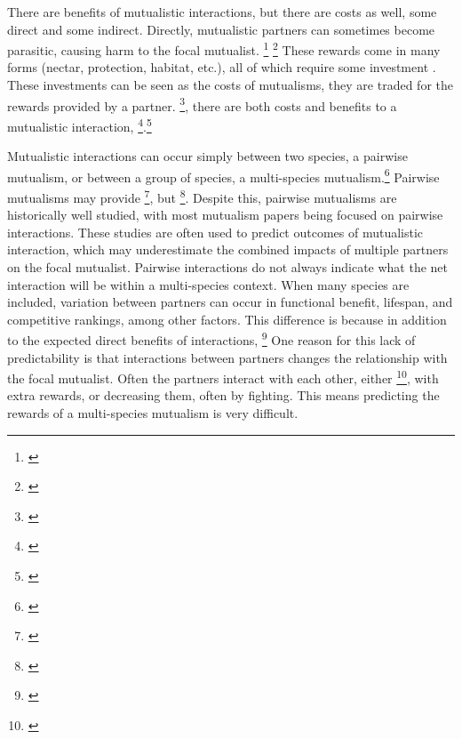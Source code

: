 \documentclass[12pt,a4paper]{article}
\newcommand{\tom}[2]{{\color{red}{#1}}\footnote{\textit{\color{red}{#2}}}}
\begin{document}
There are benefits of mutualistic interactions, but there are costs as well, some direct and some indirect. 
Directly, mutualistic partners can sometimes become parasitic, causing harm to the focal mutualist\cite{Bronstein2001a}. 
\tom{More indirectly, these interactions require energy.}{Awkward sentence, and I'm not sure why investment is reward is an indirect cost.} 
\tom{Within a mutualism, each participant offers rewards and in return receives benefits from their partners.}{No new information content in this sentence.} 
These rewards come in many forms (nectar, protection, habitat, etc.), all of which require some investment \cite{Bronstein2001}. 
These investments can be seen as the costs of mutualisms, they are traded for the rewards provided by a partner. 
\tom{Because of these trade-offs}{trade-offs between what and what?}, there are both costs and benefits to a mutualistic interaction\cite{Bronstein2001,Bronstein2001a}, \tom{particularly as the mutualism becomes more complex in the context of its environment}{I don't know what this means.}.\tom{}{Having made it to the end of this paragraph I can't really find any new information here. You are covering very basic aspects of mutualism that were already described in the first paragraph. I would get to the question/problem at the core of this paper more quickly.} 

Mutualistic interactions can occur simply between two species, a pairwise mutualism, or between a group of species, a multi-species mutualism\cite{Stanton2013}.\tom{}{Technically all mutualisms are pairwise (++) but they can be combined into many pairs.} 
Pairwise mutualisms may provide \tom{benefits of efficiency in the context of mutualisms}{I don't know what this means}, but \tom{they are not a good investment due to temporal and spatial variation}{Variation in what?}\cite{Waser1996}. 
Despite this, pairwise mutualisms are historically well studied, with most mutualism papers being focused on pairwise interactions. 
These studies are often used to predict outcomes of mutualistic interaction, which may underestimate the combined impacts of multiple partners on the focal mutualist\cite{Stanton2013,Palmer2010}. 
Pairwise interactions do not always indicate what the net interaction will be within a multi-species context\cite{Chamberlain2014,Song2020}. 
When many species are included, variation between partners can occur in functional benefit, lifespan, and competitive rankings, among other factors\cite{Stanton2013}. 
This difference is because in addition to the expected direct benefits of interactions, \tom{they can also indirectly impact the focal mutualist through other partner interactions. }{Again, I would avoid too much discussion of interaction between partners. You don't need interactions between partners to have non-additive effects, and you are priming readers to expect something that the manuscript does not deliver.}
One reason for this lack of predictability is that interactions between partners changes the relationship with the focal mutualist\cite{Afkhami2014}.  
Often the partners interact with each other, either \tom{increasing their performances}{awkward}, with extra rewards, or decreasing them, often by fighting\cite{Boucher1982}. 
This means predicting the rewards of a multi-species mutualism is very difficult. 
\end{document}

